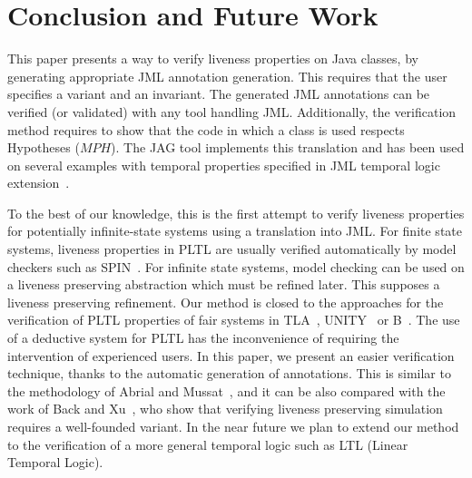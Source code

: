 \section{Conclusion and Future Work}\label{sec-conclusion} 

This paper presents a way to verify liveness properties on Java classes,
by generating appropriate JML annotation generation. 
This requires that the user specifies a
variant and an invariant. The generated JML annotations can be verified
(or validated) with any tool handling JML. Additionally, the
verification method requires to show that the code in which a
class is used respects Hypotheses ($MPH$).
The \textsf{JAG} tool implements this translation and has been
used on several examples with temporal properties specified in
JML temporal logic extension~\cite{Huis02,articleJournalTL}.

To the best of our knowledge, this is the first attempt to verify
liveness properties for potentially infinite-state systems using a
translation into JML. %
For finite state systems, liveness properties in PLTL are usually
verified automatically by model checkers such as
SPIN~\cite{spin97}. For infinite state systems, model checking
can be used on a liveness preserving %
abstraction which must be refined later. This supposes a
liveness preserving refinement.%
 Our method is closed to the
approaches for the verification of PLTL properties of fair systems
in TLA~\cite{TLA}, UNITY~\cite{unity} or B~\cite{BB02}. The use of a
deductive system for PLTL \cite{MannaPnueli83} has the inconvenience
of requiring the intervention of experienced users. In this paper, we
present an easier verification technique, thanks to the automatic
generation of annotations.  This is similar to the methodology of
Abrial and Mussat~\cite{Abrial:1998:IDC}, and it can be also compared
with the work of Back and Xu~\cite{BackXu98}, who show that
verifying liveness preserving simulation requires a well-founded
variant.
In the near future we plan to extend our method to the verification
of a more general temporal logic such as LTL (Linear Temporal Logic).

